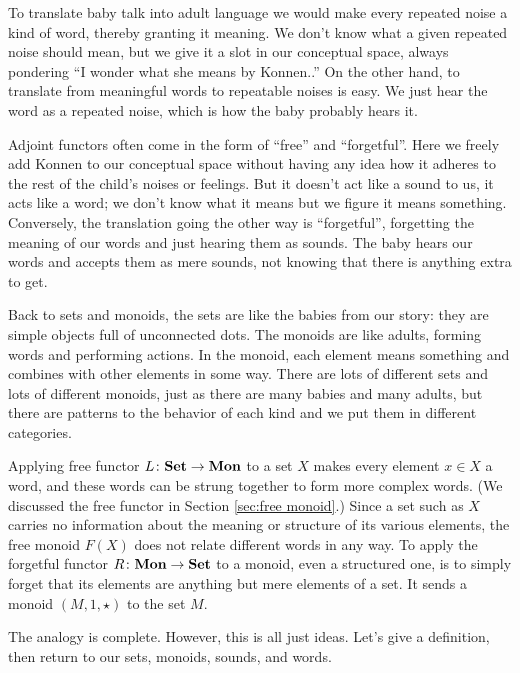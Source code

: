 \documentclass[CT4S-EN-RU]{subfiles}
\begin{document}
To translate baby talk into adult language we would make every repeated noise a kind of word, thereby granting it meaning. We don't know what a given repeated noise should mean, but we give it a slot in our conceptual space, always pondering “I wonder what she means by Konnen..” On the other hand, to translate from meaningful words to repeatable noises is easy. We just hear the word as a repeated noise, which is how the baby probably hears it.

Adjoint functors often come in the form of “free” and “forgetful”. Here we freely add Konnen to our conceptual space without having any idea how it adheres to the rest of the child's noises or feelings. But it doesn't act like a sound to us, it acts like a word; we don't know what it means but we figure it means something. Conversely, the translation going the other way is “forgetful”, forgetting the meaning of our words and just hearing them as sounds. The baby hears our words and accepts them as mere sounds, not knowing that there is anything extra to get.

Back to sets and monoids, the sets are like the babies from our story: they are simple objects full of unconnected dots. The monoids are like adults, forming words and performing actions. In the monoid, each element means something and combines with other elements in some way. There are lots of different sets and lots of different monoids, just as there are many babies and many adults, but there are patterns to the behavior of each kind and we put them in different categories.

Applying free functor $L\colon{\bf Set}\rightarrow{\bf Mon}$ to a set $X$ makes every element $x\in X$ a word, and these words can be strung together to form more complex words. (We discussed the free functor in Section \ref{sec:free monoid}.) Since a set such as $X$ carries no information about the meaning or structure of its various elements, the free monoid $F(X)$ does not relate different words in any way. To apply the forgetful functor $R\colon{\bf Mon}\rightarrow{\bf Set}$ to a monoid, even a structured one, is to simply forget that its elements are anything but mere elements of a set. It sends a monoid $(M,1,\star)$ to the set $M$. 

The analogy is complete. However, this is all just ideas. Let's give a definition, then return to our sets, monoids, sounds, and words.
\end{document}
